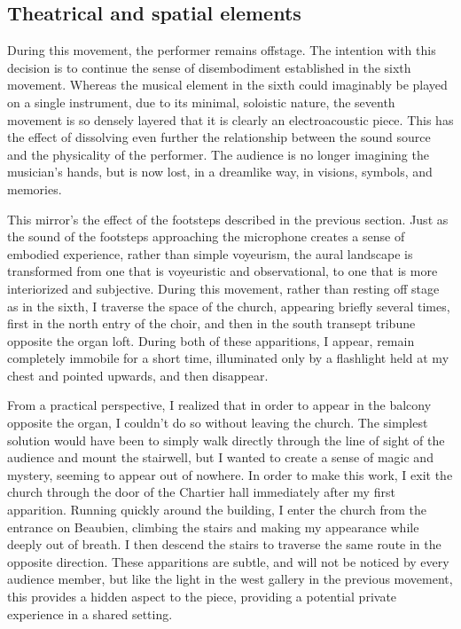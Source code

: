 \documentclass[12pt,twoside,maitrise]{dms_ks}
\theoremstyle{definition}
\begin{document}
{{\subsection{Theatrical and spatial elements}

During this movement, the performer remains offstage. 
The intention with this decision is to continue the sense of disembodiment established in the sixth movement. 
Whereas the musical element in the sixth could imaginably be played on a single instrument, due to its minimal, soloistic nature, the seventh movement is so densely layered that it is clearly an electroacoustic piece. 
This has the effect of dissolving even further the relationship between the sound source and the physicality of the performer. 
The audience is no longer imagining the musician’s hands, but is now lost, in a dreamlike way, in visions, symbols, and memories. 

This mirror’s the effect of the footsteps described in the previous section. 
Just as the sound of the footsteps approaching the microphone creates a sense of embodied experience, rather than simple voyeurism, the aural landscape is transformed from one that is voyeuristic and observational, to one that is more interiorized and subjective. 
During this movement, rather than resting off stage as in the sixth, I traverse the space of the church, appearing briefly several times, first in the north entry of the choir, and then in the south transept tribune opposite the organ loft. 
During both of these apparitions, I appear, remain completely immobile for a short time, illuminated only by a flashlight held at my chest and pointed upwards, and then disappear.

From a practical perspective, I realized that in order to appear in the balcony opposite the organ, I couldn't do so without leaving the church. 
The simplest solution would have been to simply walk directly through the line of sight of the audience and mount the stairwell, but I wanted to create a sense of magic and mystery, seeming to appear out of nowhere. 
In order to make this work, I exit the church through the door of the Chartier hall immediately after my first apparition. 
Running quickly around the building, I enter the church from the entrance on Beaubien, climbing the stairs and making my appearance while deeply out of breath. 
I then descend the stairs to traverse the same route in the opposite direction.
These apparitions are subtle, and will not be noticed by every audience member, but like the light in the west gallery in the previous movement, this provides a hidden aspect to the piece, providing a potential private experience in a shared setting. 

}}
\end{document}
